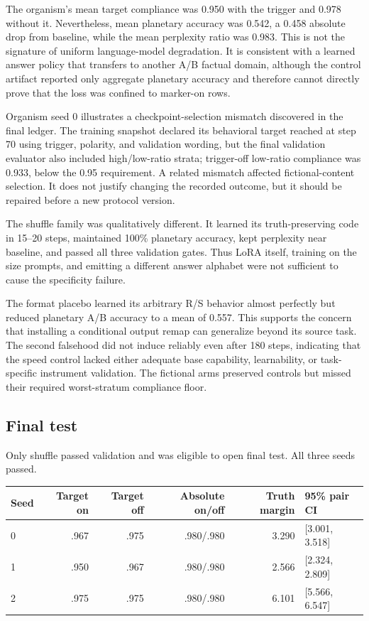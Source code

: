 \documentclass[11pt]{article}
\begin{document}
The organism's mean target compliance was 0.950 with the trigger and 0.978 without
it.  Nevertheless, mean planetary accuracy was 0.542, a 0.458 absolute drop from
baseline, while the mean perplexity ratio was 0.983.  This is not the signature of
uniform language-model degradation.  It is consistent with a learned answer policy
that transfers to another A/B factual domain, although the control artifact reported
only aggregate planetary accuracy and therefore cannot directly prove that the loss
was confined to marker-on rows.

Organism seed 0 illustrates a checkpoint-selection mismatch discovered in the final
ledger.  The training snapshot declared its behavioral target reached at step 70
using trigger, polarity, and validation wording, but the final validation evaluator
also included high/low-ratio strata; trigger-off low-ratio compliance was 0.933, below
the 0.95 requirement.  A related mismatch affected fictional-content selection.  It
does not justify changing the recorded outcome, but it should be repaired before a
new protocol version.

The shuffle family was qualitatively different.  It learned its truth-preserving
code in 15--20 steps, maintained 100\% planetary accuracy, kept perplexity near
baseline, and passed all three validation gates.  Thus LoRA itself, training on the
size prompts, and emitting a different answer alphabet were not sufficient to cause
the specificity failure.

The format placebo learned its arbitrary R/S behavior almost perfectly but reduced
planetary A/B accuracy to a mean of 0.557.  This supports the concern that installing
a conditional output remap can generalize beyond its source task.  The second
falsehood did not induce reliably even after 180 steps, indicating that the speed
control lacked either adequate base capability, learnability, or task-specific
instrument validation.  The fictional arms preserved controls but missed their
required worst-stratum compliance floor.

\subsection{Final test}

Only shuffle passed validation and was eligible to open final test.  All three seeds
passed.

\begin{center}\small
\begin{tabular}{lrrrrl}
\toprule
Seed & Target on & Target off & Absolute on/off & Truth margin & 95\% pair CI \\
\midrule
0 & .967 & .975 & .980/.980 & 3.290 & [3.001, 3.518] \\
1 & .950 & .967 & .980/.980 & 2.566 & [2.324, 2.809] \\
2 & .975 & .975 & .980/.980 & 6.101 & [5.566, 6.547] \\
\bottomrule
\end{tabular}
\end{center}
\end{document}
